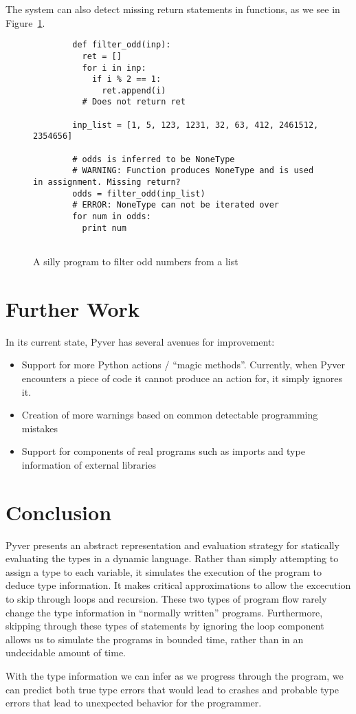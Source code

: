 \documentclass{article}[12pt]
\begin{document}
The system can also detect missing return statements in functions, as we see in
Figure~\ref{fig:noreturn}.
\begin{figure}
    \begin{verbatim}
        def filter_odd(inp):
          ret = []
          for i in inp:
            if i % 2 == 1:
              ret.append(i)
          # Does not return ret

        inp_list = [1, 5, 123, 1231, 32, 63, 412, 2461512, 2354656]

        # odds is inferred to be NoneType
        # WARNING: Function produces NoneType and is used in assignment. Missing return?
        odds = filter_odd(inp_list)
        # ERROR: NoneType can not be iterated over
        for num in odds:
          print num
    
    \end{verbatim}
    \caption{A silly program to filter odd numbers from a list}
    \label{fig:noreturn}
\end{figure}
\section{Further Work}

In its current state, Pyver has several avenues for improvement: 
\begin{itemize}
      \item Support for more Python actions / ``magic methods''. Currently, when Pyver encounters a
          piece of code it cannot produce an action for, it simply ignores it.
      \item Creation of more warnings based on common detectable programming mistakes
      \item Support for components of real programs such as imports and type information of external
          libraries
\end{itemize}

\section{Conclusion}

Pyver presents an abstract representation and evaluation strategy for statically evaluating the
types in a dynamic language. Rather than simply attempting to assign a type to each variable, it
simulates the execution of the program to deduce type information. It makes critical approximations
to allow the excecution to skip through loops and recursion. These two types of program flow rarely
change the type information in ``normally written'' programs. Furthermore, skipping through these
types of statements by ignoring the loop component allows us to simulate the programs in bounded 
time, rather than in an undecidable amount of time.

With the type information we can infer as we progress through the program, we can predict both true
type errors that would lead to crashes and probable type errors that lead to unexpected behavior for
the programmer.
\end{document}
